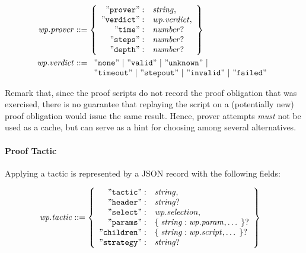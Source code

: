 \begin{align*}
    \mathit{wp.prover} &::=
    \left\{
    \begin{array}{rl}
        \mathtt{"prover"}  :& \mathit{string}, \\
        \mathtt{"verdict"} :& \mathit{wp.verdict}, \\
        \mathtt{"time"}    :& \mathit{number}? \\
        \mathtt{"steps"}   :& \mathit{number}? \\
        \mathtt{"depth"}   :& \mathit{number}? \\
    \end{array}
    \right\} \\
    \mathit{wp.verdict} &::=
    \begin{array}[t]{l}
    \mathtt{"none"} ~|~
    \mathtt{"valid"} ~|~
    \mathtt{"unknown"} ~|~ \\
    \mathtt{"timeout"} ~|~
    \mathtt{"stepout"} ~|~
    \mathtt{"invalid"} ~|~
    \mathtt{"failed"}
    \end{array}
\end{align*}

Remark that, since the proof scripts do not record the proof obligation that was exercised, there is no
guarantee that replaying the script on a (potentially new) proof obligation would issue the same result.
Hence, prover attempts \emph{must} not be used as a cache, but can serve as a hint for choosing among
several alternatives.

\paragraph{Proof Tactic} Applying a tactic is represented by a \textsf{JSON} record with the following
fields:

\begin{align*}
    \mathit{wp.tactic} &::=
    \left\{
    \begin{array}{rl}
        \mathtt{"tactic"}   :& \mathit{string}, \\
        \mathtt{"header"}   :& \mathit{string} ? \\
        \mathtt{"select"}   :& \mathit{wp.selection}, \\
        \mathtt{"params"}   :& \mathtt{\{}\; \mathit{string}:\mathit{wp.param} ,\ldots \;\mathtt{\}} ? \\
        \mathtt{"children"} :& \mathtt{\{}\; \mathit{string}:\mathit{wp.script}, \ldots \;\mathtt{\}} ? \\
        \mathtt{"strategy"} :& \mathit{string} ? \\
    \end{array}
    \right\}
\end{align*}


